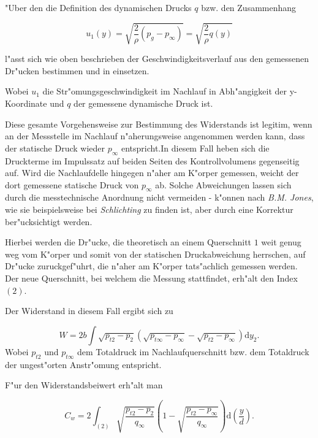 "Uber den die Definition des dynamischen Drucks $q$ bzw. den Zusammenhang
\begin{center}
	\begin{equation}
		\label{geschwindigkeitsformel}
		u_{1}(y)= \sqrt{\frac{2}{\rho}(p_g - p_{\infty}) } = \sqrt{\frac{2}{\rho} q(y)}
	\end{equation}
\end{center}
l"asst sich wie oben beschrieben der Geschwindigkeitsverlauf aus den gemessenen Dr"ucken bestimmen und in  einsetzen.

Wobei $u_{1}$ die Str"omungsgeschwindigkeit im Nachlauf in Abh"angigkeit der y-Koordinate und $q$ der gemessene dynamische Druck ist.

Diese gesamte Vorgehensweise zur Bestimmung des Widerstands ist legitim, wenn an der Messstelle im Nachlauf n"aherungsweise angenommen werden kann, dass der statische Druck wieder $p_\infty$ entspricht.In diesem Fall heben sich die Druckterme im Impulssatz auf  beiden Seiten des Kontrollvolumens gegenseitig auf.
Wird die Nachlaufdelle hingegen n"aher am K"orper gemessen, weicht der dort gemessene statische Druck von $p_{\infty}$ ab.
Solche Abweichungen lassen sich durch die messtechnische Anordnung nicht vermeiden - 
k"onnen nach \textit{B.M. Jones}, wie sie beispielsweise bei \textit{Schlichting} \cite{Schlichting.2001} zu finden ist, aber durch eine Korrektur ber"ucksichtigt werden.

Hierbei werden die Dr"ucke, die theoretisch an einem Querschnitt $1$  weit genug weg vom K"orper und somit von der statischen Druckabweichung herrschen, auf Dr"ucke zuruckgef"uhrt, die n"aher am K"orper tats"achlich gemessen werden.
Der neue Querschnitt, bei welchem die Messung stattfindet, erh"alt den Index $(2)$.

Der Widerstand in diesem Fall ergibt sich zu

\begin{equation}
	\label{eq:widerstand_korrigiert}
	W = 2b \int \sqrt{p_{t2} - p_2} \left(\sqrt{p_{t\infty} - p_{\infty}} - \sqrt{p_{t2} - p_{\infty}}\right) \mathrm{d} y_2 .
\end{equation}
Wobei $p_{t2}$ und $p_{t\infty}$ dem Totaldruck im Nachlaufquerschnitt bzw. dem Totaldruck der ungest"orten Anstr"omung entspricht.

F"ur den Widerstandsbeiwert erh"alt man

\begin{equation}
	\label{eq:C_w_korrigiert}
	C_w = 2 \int_{(2)} \sqrt{\frac{p_{t2} - p_2}{q_{\infty}}}
	\left(1 - \sqrt{\frac{p_{t2} - p_{\infty}}{q_{\infty}}}\right)  \mathrm{d}\left(\frac{y}{d}\right).
\end{equation}

